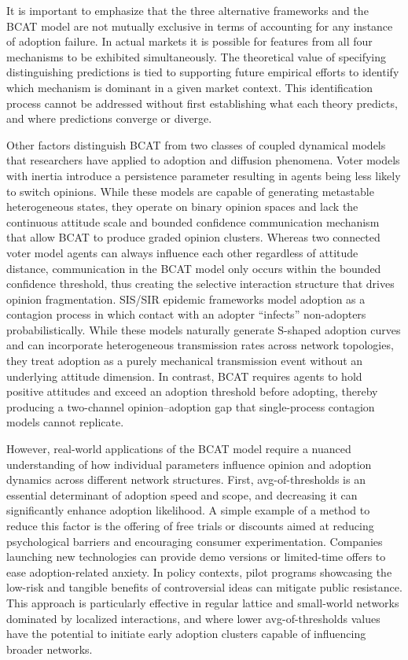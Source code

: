 \documentclass[10pt,letterpaper]{article}
\begin{document}
It is important to emphasize that the three alternative frameworks and the BCAT model are not mutually exclusive in terms of accounting for any instance of adoption failure. In actual markets it is possible for features from all four mechanisms to be exhibited simultaneously. The theoretical value of specifying distinguishing predictions is tied to supporting future empirical efforts to identify which mechanism is dominant in a given market context. This identification process cannot be addressed without first establishing what each theory predicts, and where predictions converge or diverge.

Other factors distinguish BCAT from two classes of coupled dynamical models that researchers have applied to adoption and diffusion phenomena. Voter models with inertia \cite{Stark2008} introduce a persistence parameter resulting in agents being less likely to switch opinions. While these models are capable of generating metastable heterogeneous states, they operate on binary opinion spaces and lack the continuous attitude scale and bounded confidence communication mechanism that allow BCAT to produce graded opinion clusters. Whereas two connected voter model agents can always influence each other regardless of attitude distance, communication in the BCAT model only occurs within the bounded confidence threshold, thus creating the selective interaction structure that drives opinion fragmentation. SIS/SIR epidemic frameworks model adoption as a contagion process in which contact with an adopter ``infects'' non-adopters probabilistically. While these models naturally generate S-shaped adoption curves and can incorporate heterogeneous transmission rates across network topologies, they treat adoption as a purely mechanical transmission event without an underlying attitude dimension. In contrast, BCAT requires agents to hold positive attitudes and exceed an adoption threshold before adopting, thereby producing a two-channel opinion--adoption gap that single-process contagion models cannot replicate.

However, real-world applications of the BCAT model require a nuanced understanding of how individual parameters influence opinion and adoption dynamics across different network structures. First, avg-of-thresholds is an essential determinant of adoption speed and scope, and decreasing it can significantly enhance adoption likelihood. A simple example of a method to reduce this factor is the offering of free trials or discounts aimed at reducing psychological barriers and encouraging consumer experimentation. Companies launching new technologies can provide demo versions or limited-time offers to ease adoption-related anxiety. In policy contexts, pilot programs showcasing the low-risk and tangible benefits of controversial ideas can mitigate public resistance. This approach is particularly effective in regular lattice and small-world networks dominated by localized interactions, and where lower avg-of-thresholds values have the potential to initiate early adoption clusters capable of influencing broader networks.
\end{document}

